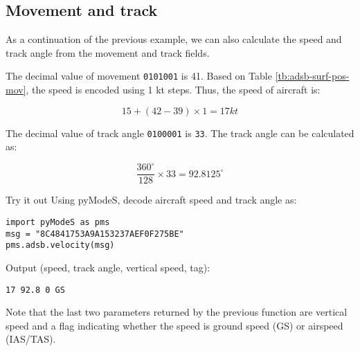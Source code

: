 \subsection{Movement and track}

As a continuation of the previous example, we can also calculate the speed and track angle from the movement and track fields.

The decimal value of movement \texttt{0101001} is 41. Based on Table \ref{tb:adsb-surf-pos-mov}, the speed is encoded using 1 kt steps. Thus, the speed of aircraft is:

\begin{equation}
  15 + (42 - 39) \times 1 = 17 kt
\end{equation}

The decimal value of track angle \texttt{0100001} is \texttt{33}. The track angle can be calculated as:

\begin{equation}
  \frac{360^\circ}{128} \times 33 = 92.8125 ^\circ
\end{equation}

\begin{notebox}{Try it out}
Using pyModeS, decode aircraft speed and track angle as: 

\begin{verbatim}
import pyModeS as pms
msg = "8C4841753A9A153237AEF0F275BE"
pms.adsb.velocity(msg)
\end{verbatim}

Output (speed, track angle, vertical speed, tag): 

\begin{verbatim}
17 92.8 0 GS
\end{verbatim}


Note that the last two parameters returned by the previous function are vertical speed and a flag indicating whether the speed is ground speed (GS) or airspeed (IAS/TAS).

\end{notebox}
